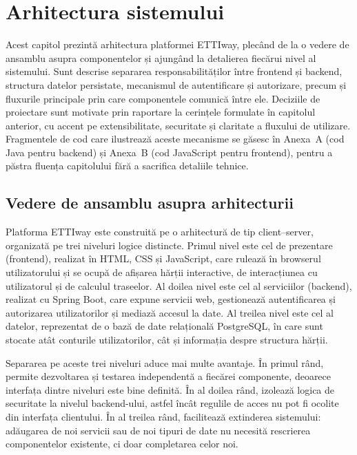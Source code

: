 
\chapter{Arhitectura sistemului}
\label{cap:arhitectura}

Acest capitol prezintă arhitectura platformei ETTIway, plecând de la o vedere de
ansamblu asupra componentelor și ajungând la detalierea fiecărui nivel al
sistemului. Sunt descrise separarea responsabilităților între frontend și
backend, structura datelor persistate, mecanismul de autentificare și
autorizare, precum și fluxurile principale prin care componentele comunică între
ele. Deciziile de proiectare sunt motivate prin raportare la cerințele
formulate în capitolul anterior, cu accent pe extensibilitate, securitate și
claritate a fluxului de utilizare. Fragmentele de cod care ilustrează aceste
mecanisme se găsesc în Anexa~A (cod Java pentru backend) și Anexa~B (cod
JavaScript pentru frontend), pentru a păstra fluența capitolului fără a
sacrifica detaliile tehnice.

\section{Vedere de ansamblu asupra arhitecturii}
\label{sec:ansamblu}

Platforma ETTIway este construită pe o arhitectură de tip client–server,
organizată pe trei niveluri logice distincte. Primul nivel este cel de
prezentare (frontend), realizat în HTML, CSS și JavaScript, care rulează în
browserul utilizatorului și se ocupă de afișarea hărții interactive, de
interacțiunea cu utilizatorul și de calculul traseelor. Al doilea nivel este
cel al serviciilor (backend), realizat cu Spring Boot, care expune servicii
web, gestionează autentificarea și autorizarea utilizatorilor și mediază
accesul la date. Al treilea nivel este cel al datelor, reprezentat de o bază
de date relațională PostgreSQL, în care sunt stocate atât conturile
utilizatorilor, cât și informația despre structura hărții.

Separarea pe aceste trei niveluri aduce mai multe avantaje. În primul rând,
permite dezvoltarea și testarea independentă a fiecărei componente, deoarece
interfața dintre niveluri este bine definită. În al doilea rând, izolează
logica de securitate la nivelul backend-ului, astfel încât regulile de acces
nu pot fi ocolite din interfața clientului. În al treilea rând, facilitează
extinderea sistemului: adăugarea de noi servicii sau de noi tipuri de date nu
necesită rescrierea componentelor existente, ci doar completarea celor noi.

